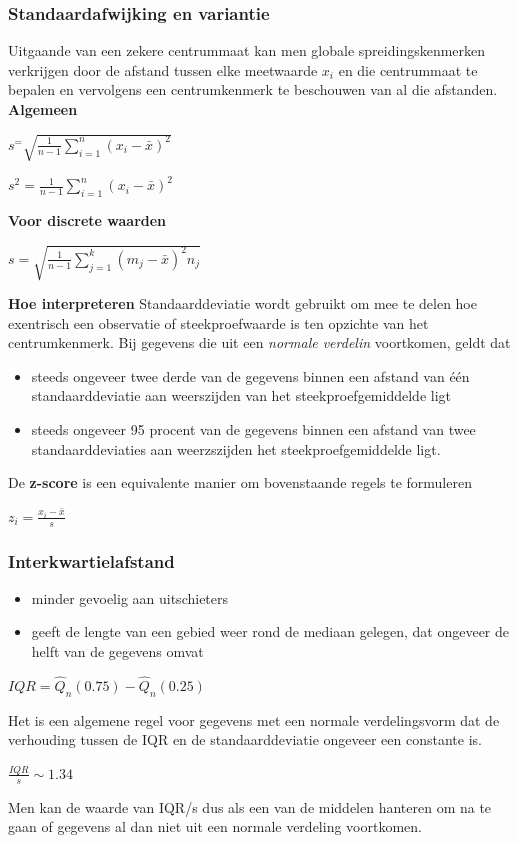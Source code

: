 \documentclass[titlepage]{article}
\numberwithin{equation}{section}
\begin{document}
\subsubsection{Standaardafwijking en variantie}
Uitgaande van een zekere centrummaat kan men globale spreidingskenmerken verkrijgen door de afstand tussen elke meetwaarde $x_{i}$ en die centrummaat te bepalen en vervolgens een centrumkenmerk te beschouwen van al die afstanden. 
\newline\newline\textbf{Algemeen}
\begin{center}
	$s^ = \sqrt{\frac{1}{n - 1} \sum\limits_{i=1}^n (x_{i} - \bar{x})^2}$ 
\end{center}
\begin{center}
	$s^2 = \frac{1}{n - 1} \sum\limits_{i=1}^n (x_{i} - \bar{x})^2$ 
\end{center}
\textbf{Voor discrete waarden}
\begin{center}
$ s = \sqrt{\frac{1}{n - 1} \sum\limits_{j=1}^k (m_{j} - \bar{x})^2 n_{j}}$
\end{center}
\textbf{Hoe interpreteren}
Standaarddeviatie wordt gebruikt om mee te delen hoe exentrisch een observatie of steekproefwaarde is ten opzichte van het centrumkenmerk. 
\newline\newline Bij gegevens die uit een \textit{normale verdelin} voortkomen, geldt dat
\begin{itemize}
	\item steeds ongeveer twee derde van de gegevens binnen een afstand van één standaarddeviatie aan weerszijden van het steekproefgemiddelde ligt
	\item steeds ongeveer 95 procent van de gegevens binnen een afstand van twee standaarddeviaties aan weerzszijden het steekproefgemiddelde ligt.
\end{itemize}
De \textbf{z-score} is een equivalente manier om bovenstaande regels te formuleren
\begin{center}
	$z_{i} = \frac{x_{i} - \bar{x}}{s}$
\end{center}
\subsubsection{Interkwartielafstand}
\begin{itemize}
	\item minder gevoelig aan uitschieters
	\item geeft de lengte van een gebied weer rond de mediaan gelegen, dat ongeveer de helft van de gegevens omvat
\end{itemize}
\begin{center}
	$IQR = \hat{Q}_{n}(0.75)-\hat{Q}_{n}(0.25)$
\end{center}
Het is een algemene regel voor gegevens met een normale verdelingsvorm dat de verhouding tussen de IQR en de standaarddeviatie ongeveer een constante is.
\begin{center}
	$\frac{IQR}{s} \sim 1.34$
\end{center}
Men kan de waarde van IQR/s dus als een van de middelen hanteren om na te gaan of gegevens al dan niet uit een normale verdeling voortkomen.
\end{document}
